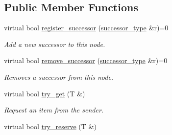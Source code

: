 \subsection*{Public Member Functions}
\begin{DoxyCompactItemize}
\item 
\hypertarget{classtbb_1_1flow_1_1interface7_1_1sender_a4dac8f53a1f8373c1f3a874b9617e4ec}{}virtual bool \hyperlink{classtbb_1_1flow_1_1interface7_1_1sender_a4dac8f53a1f8373c1f3a874b9617e4ec}{register\+\_\+successor} (\hyperlink{classtbb_1_1flow_1_1interface7_1_1sender_a7779627063a29d4d2a1fc905a5cae8db}{successor\+\_\+type} \&r)=0\label{classtbb_1_1flow_1_1interface7_1_1sender_a4dac8f53a1f8373c1f3a874b9617e4ec}

\begin{DoxyCompactList}\small\item\em Add a new successor to this node. \end{DoxyCompactList}\item 
\hypertarget{classtbb_1_1flow_1_1interface7_1_1sender_ac1ae19f49e31c6ca94dcf14732eb7a64}{}virtual bool \hyperlink{classtbb_1_1flow_1_1interface7_1_1sender_ac1ae19f49e31c6ca94dcf14732eb7a64}{remove\+\_\+successor} (\hyperlink{classtbb_1_1flow_1_1interface7_1_1sender_a7779627063a29d4d2a1fc905a5cae8db}{successor\+\_\+type} \&r)=0\label{classtbb_1_1flow_1_1interface7_1_1sender_ac1ae19f49e31c6ca94dcf14732eb7a64}

\begin{DoxyCompactList}\small\item\em Removes a successor from this node. \end{DoxyCompactList}\item 
\hypertarget{classtbb_1_1flow_1_1interface7_1_1sender_ad50b8ac93e79cbdcd2bba11d35432f2c}{}virtual bool \hyperlink{classtbb_1_1flow_1_1interface7_1_1sender_ad50b8ac93e79cbdcd2bba11d35432f2c}{try\+\_\+get} (T \&)\label{classtbb_1_1flow_1_1interface7_1_1sender_ad50b8ac93e79cbdcd2bba11d35432f2c}

\begin{DoxyCompactList}\small\item\em Request an item from the sender. \end{DoxyCompactList}\item 
\hypertarget{classtbb_1_1flow_1_1interface7_1_1sender_aa1b9dcf77ab558530ff93a706b4c4b5d}{}virtual bool \hyperlink{classtbb_1_1flow_1_1interface7_1_1sender_aa1b9dcf77ab558530ff93a706b4c4b5d}{try\+\_\+reserve} (T \&)\label{classtbb_1_1flow_1_1interface7_1_1sender_aa1b9dcf77ab558530ff93a706b4c4b5d}


\end{DoxyCompactItemize}
